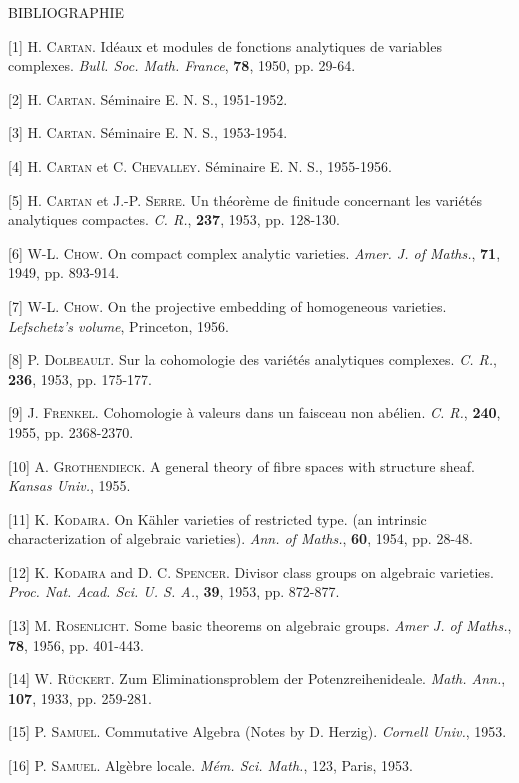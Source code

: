 BIBLIOGRAPHIE

[1] H. \textsc{Cartan}. Idéaux et modules de fonctions analytiques de variables complexes. \textit{Bull. Soc. Math. France}, \textbf{78}, 1950, pp. 29-64.

[2] H. \textsc{Cartan}. Séminaire E. N. S., 1951-1952.

[3] H. \textsc{Cartan}. Séminaire E. N. S., 1953-1954.

[4] H. \textsc{Cartan} et C. \textsc{Chevalley}. Séminaire E. N. S., 1955-1956.

[5] H. \textsc{Cartan} et J.-P. \textsc{Serre}. Un théorème de finitude concernant les variétés analytiques compactes. \textit{C. R.}, \textbf{237}, 1953, pp. 128-130.

[6] W-L. \textsc{Chow}. On compact complex analytic varieties. \textit{Amer. J. of Maths.}, \textbf{71}, 1949, pp. 893-914.

[7] W-L. \textsc{Chow}. On the projective embedding of homogeneous varieties. \textit{Lefschetz's volume}, Princeton, 1956.

[8] P. \textsc{Dolbeault}. Sur la cohomologie des variétés analytiques complexes. \textit{C. R.}, \textbf{236}, 1953, pp. 175-177.

[9] J. \textsc{Frenkel}. Cohomologie à valeurs dans un faisceau non abélien. \textit{C. R.}, \textbf{240}, 1955, pp. 2368-2370.

[10] A. \textsc{Grothendieck}. A general theory of fibre spaces with structure sheaf. \textit{Kansas Univ.}, 1955.

[11] K. \textsc{Kodaira}. On Kähler varieties of restricted type. (an intrinsic characterization of algebraic varieties). \textit{Ann. of Maths.}, \textbf{60}, 1954, pp. 28-48.

[12] K. \textsc{Kodaira} and D. C. \textsc{Spencer}. Divisor class groups on algebraic varieties. \textit{Proc. Nat. Acad. Sci. U. S. A.}, \textbf{39}, 1953, pp. 872-877.

[13] M. \textsc{Rosenlicht}. Some basic theorems on algebraic groups. \textit{Amer J. of Maths.}, \textbf{78}, 1956, pp. 401-443.

[14] W. \textsc{Rückert}. Zum Eliminationsproblem der Potenzreihenideale. \textit{Math. Ann.}, \textbf{107}, 1933, pp. 259-281.

[15] P. \textsc{Samuel}. Commutative Algebra (Notes by D. Herzig). \textit{Cornell Univ.}, 1953.

[16] P. \textsc{Samuel}. Algèbre locale. \textit{Mém. Sci. Math.}, 123, Paris, 1953.


